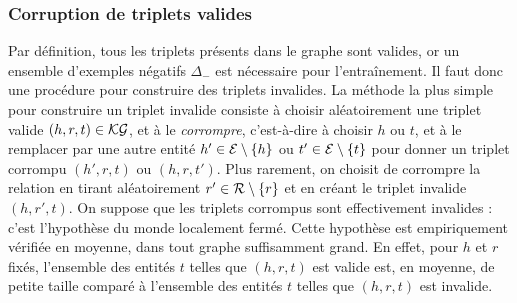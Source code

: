 \subsubsection{Corruption de triplets valides}
\label{subsec:kge-data-corruption}

Par définition, tous les triplets présents dans le graphe sont valides, or un ensemble d'exemples négatifs $\Delta_-$ est nécessaire pour l'entraînement. Il faut donc une procédure pour construire des triplets invalides. La méthode la plus simple pour construire un triplet invalide consiste à choisir aléatoirement une triplet valide $(h, r, t) \in \mathcal{KG}$, et à le \textit{corrompre}, c'est-à-dire à choisir $h$ ou $t$, et à le remplacer par une autre entité $h' \in \mathcal{E} \setminus \{ h \}$ ou $t' \in \mathcal{E} \setminus \{ t \}$ pour donner un triplet corrompu $(h', r, t)$ ou $(h, r, t')$. Plus rarement, on choisit de corrompre la relation en tirant aléatoirement $r' \in \mathcal{R} \setminus \{ r \}$ et en créant le triplet invalide $(h, r', t)$. On suppose que les triplets corrompus sont effectivement invalides : c'est l'hypothèse du monde localement fermé. Cette hypothèse est empiriquement vérifiée en moyenne, dans tout graphe suffisamment grand. En effet, pour $h$ et $r$ fixés, l'ensemble des entités $t$ telles que $(h, r, t)$ est valide est, en moyenne, de petite taille comparé à l'ensemble des entités $t$ telles que $(h, r, t)$ est invalide.

